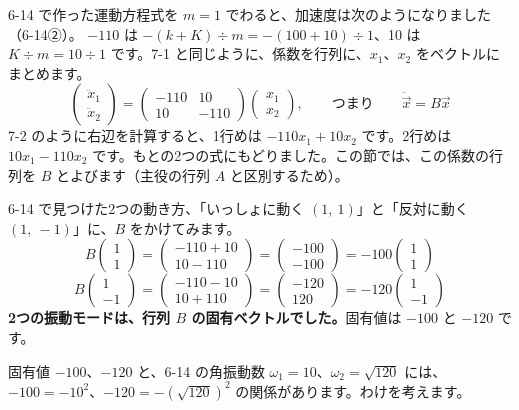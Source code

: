 6-14 で作った運動方程式を $m=1$ でわると、加速度は次のようになりました（6-14②）。
$-110$ は $-(k+K)\div m=-(100+10)\div1$、10 は $K\div m=10\div1$ です。7-1 と同じように、係数を行列に、$x_1$、$x_2$ をベクトルにまとめます。
\[ \begin{pmatrix}\ddot x_1\\\ddot x_2\end{pmatrix}=\begin{pmatrix}-110&10\\10&-110\end{pmatrix}\begin{pmatrix}x_1\\x_2\end{pmatrix},\qquad\text{つまり}\qquad \ddot{\vec x}=B\vec x \]
7-2 のように右辺を計算すると、1行めは $-110x_1+10x_2$ です。2行めは $10x_1-110x_2$ です。もとの2つの式にもどりました。この節では、この係数の行列を $B$ とよびます（主役の行列 $A$ と区別するため）。

6-14 で見つけた2つの動き方、「いっしょに動く $(1,\ 1)$」と「反対に動く $(1,\ -1)$」に、$B$ をかけてみます。
\[ B\begin{pmatrix}1\\1\end{pmatrix}=\begin{pmatrix}-110+10\\10-110\end{pmatrix}=\begin{pmatrix}-100\\-100\end{pmatrix}=-100\begin{pmatrix}1\\1\end{pmatrix} \]
\[ B\begin{pmatrix}1\\-1\end{pmatrix}=\begin{pmatrix}-110-10\\10+110\end{pmatrix}=\begin{pmatrix}-120\\120\end{pmatrix}=-120\begin{pmatrix}1\\-1\end{pmatrix} \]
\textbf{2つの振動モードは、行列 $B$ の固有ベクトルでした。}固有値は $-100$ と $-120$ です。

固有値 $-100$、$-120$ と、6-14 の角振動数 $\omega_1=10$、$\omega_2=\sqrt{120}$ には、$-100=-10^2$、$-120=-(\sqrt{120})^2$ の関係があります。わけを考えます。

